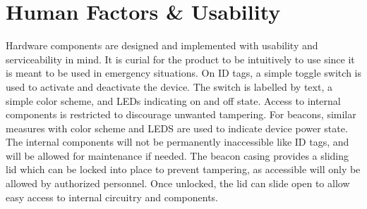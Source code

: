 

\setcounter{section}{4}
\section{Human Factors \& Usability}

\bigskip
Hardware components are designed and implemented with usability and serviceability in mind. It is curial for the product to be intuitively to use since it is meant to be used in emergency situations. On 
ID tags, a simple toggle switch is used to activate and deactivate the device. The switch is labelled by text, a simple color scheme, and LEDs indicating on and off state. Access to internal components is restricted to discourage unwanted tampering. For beacons, similar measures with color scheme and LEDS are used to indicate device power state. The internal components will not be permanently inaccessible like ID tags, and will be allowed for maintenance if needed. The beacon casing provides a sliding lid which can be locked into place to prevent tampering, as accessible will only be allowed by authorized personnel.  Once unlocked, the lid can slide open to allow easy access to internal circuitry and components. 

\bigskip